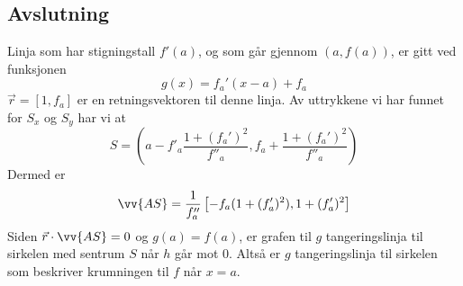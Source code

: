\subsection*{Avslutning}
Linja som har stigningstall $ f'(a) $, og som går gjennom $ (a, f(a)) $, er gitt ved funksjonen 
\[ g(x)=f_a'(x-a)+f_a \]
$ \vec{r}=[1, f_a] $ er en retningsvektoren til denne linja. 
Av uttrykkene vi har funnet for $ S_x $ og $ S_y $ har vi at
\[ S=\left(a-f'_a\frac{1+(f_a')^2}{f''_a}, f_a+\frac{1+(f_a')^2}{f''_a}\right) \]
Dermed er
\[ \vv{AS}= \frac{1}{f_a''}\left[-f_a(1+(f_a')^2), 1+(f_a')^2\right] \]
Siden $ {\vec{r}\cdot \vv{AS}=0 }$ og $ {g(a)=f(a)} $, er grafen til $ g $ tangeringslinja til sirkelen med sentrum $ S $ når $ h $ går mot 0. Altså er $ g $ tangeringslinja til sirkelen som beskriver krumningen til $ f $ når $ x=a $.


